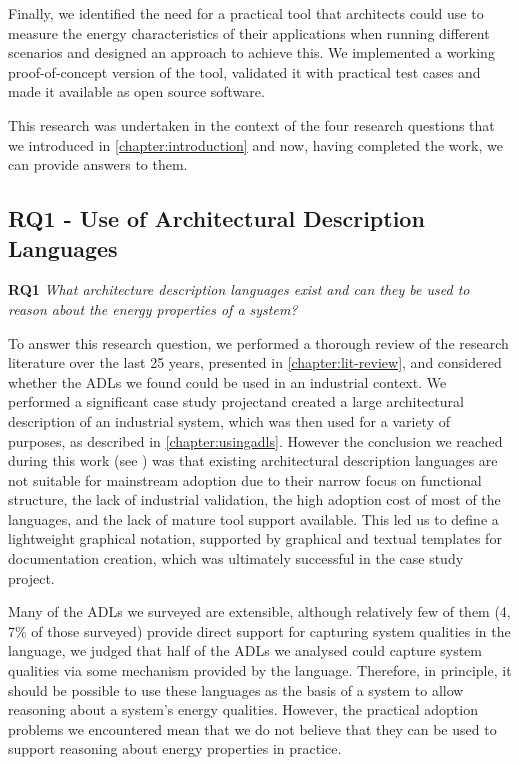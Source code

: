 Finally, we identified the need for a practical tool that architects could use to measure the energy characteristics of their applications when running different scenarios and designed an approach to achieve this.  We implemented a working proof-of-concept version of the tool, validated it with practical test cases and made it available as open source software.

This research was undertaken in the context of the four research questions that we introduced in \cref{chapter:introduction} and now, having completed the work, we can provide answers to them.

\subsection{RQ1 - Use of Architectural Description Languages}

\textbf{RQ1} \emph{What architecture description languages exist and can they be used to reason about the energy properties of a system?}

To answer this research question, we performed a thorough review of the research literature over the last 25 years, presented in \cref{chapter:lit-review}, and considered whether the ADLs we found could be used in an industrial context.  We performed a significant case study projectand created a large architectural description of an industrial system, which was then used for a variety of purposes, as described in \cref{chapter:usingadls}.  However the conclusion we reached during this work (see ) was that existing architectural description languages are not suitable for mainstream adoption due to their narrow focus on functional structure, the lack of industrial validation, the high adoption cost of most of the languages, and the lack of mature tool support available.  This led us to define a lightweight graphical notation, supported by graphical and textual templates for documentation creation, which was ultimately successful in the case study project.

Many of the ADLs we surveyed are extensible, although relatively few of them (4, 7\% of those surveyed) provide direct support for capturing system qualities in the language, we judged that half of the ADLs we analysed could capture system qualities via some mechanism provided by the language.  Therefore, in principle, it should be possible to use these languages as the basis of a system to allow reasoning about a system's energy qualities.  However, the practical adoption problems we encountered mean that we do not believe that they can be used to support reasoning about energy properties in practice.

